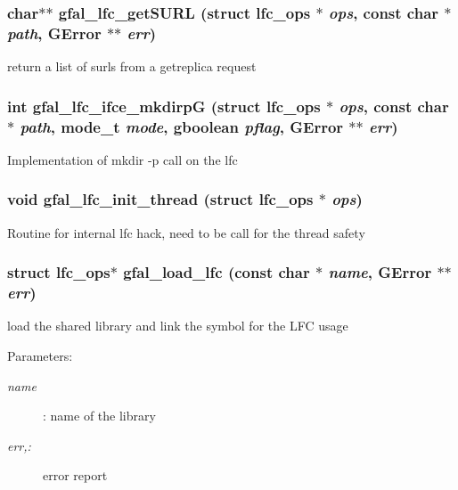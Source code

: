 \subsubsection{\setlength{\rightskip}{0pt plus 5cm}char$\ast$$\ast$ gfal\_\-lfc\_\-get\-SURL (struct lfc\_\-ops $\ast$ {\em ops}, const char $\ast$ {\em path}, GError $\ast$$\ast$ {\em err})}\label{lfc__ifce__ng_8h_26c355c9cf576886a743ab1917de295d}


return a list of surls from a getreplica request 
\subsubsection{\setlength{\rightskip}{0pt plus 5cm}int gfal\_\-lfc\_\-ifce\_\-mkdirp\-G (struct lfc\_\-ops $\ast$ {\em ops}, const char $\ast$ {\em path}, mode\_\-t {\em mode}, gboolean {\em pflag}, GError $\ast$$\ast$ {\em err})}\label{lfc__ifce__ng_8h_9fa43925882e2e196e0020b529827d3c}


Implementation of mkdir -p call on the lfc 
\subsubsection{\setlength{\rightskip}{0pt plus 5cm}void gfal\_\-lfc\_\-init\_\-thread (struct lfc\_\-ops $\ast$ {\em ops})}\label{lfc__ifce__ng_8h_aed5d8ab4c88e918990444e53930bfa4}


Routine for internal lfc hack, need to be call for the thread safety 
\subsubsection{\setlength{\rightskip}{0pt plus 5cm}struct lfc\_\-ops$\ast$ gfal\_\-load\_\-lfc (const char $\ast$ {\em name}, GError $\ast$$\ast$ {\em err})}\label{lfc__ifce__ng_8h_7c91643749a2c5d7e8043c0e42d00fd6}


load the shared library and link the symbol for the LFC usage \begin{Desc}
\item[Parameters:]
\begin{description}
\item[{\em name}]: name of the library \item[{\em err,:}]error report \end{description}
\end{Desc}
